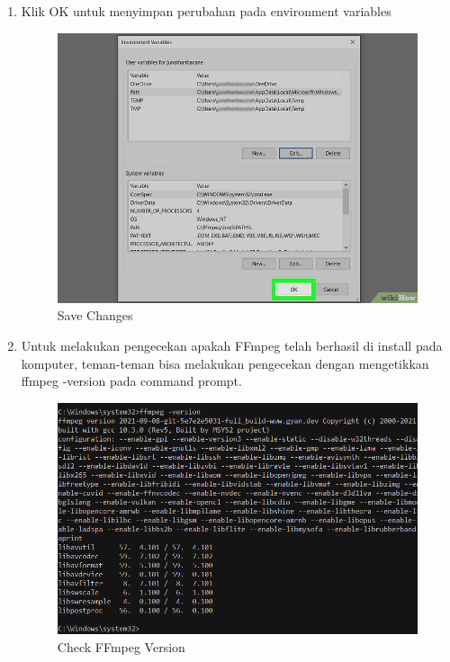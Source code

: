 \begin{enumerate}
\item Klik OK untuk menyimpan perubahan pada environment variables
\begin{figure}[H]
\centering
\includegraphics[scale=1.2]{figures/python13}
\caption{Save Changes}
\label{python13}
\end{figure}

\item Untuk melakukan pengecekan apakah FFmpeg telah berhasil di install pada komputer, teman-teman bisa melakukan pengecekan dengan mengetikkan ffmpeg -version pada command prompt.
\begin{figure}[H]
\centering
\includegraphics[scale=.35]{figures/python14}
\caption{Check FFmpeg Version}
\label{python14}
\end{figure}

\end{enumerate}


